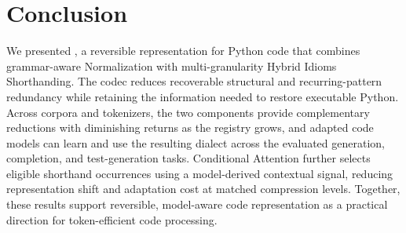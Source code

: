 \section{Conclusion}

We presented \tool, a reversible representation for Python code that combines grammar-aware Normalization with multi-granularity Hybrid Idioms Shorthanding. The codec reduces recoverable structural and recurring-pattern redundancy while retaining the information needed to restore executable Python. Across corpora and tokenizers, the two components provide complementary reductions with diminishing returns as the registry grows, and adapted code models can learn and use the resulting dialect across the evaluated generation, completion, and test-generation tasks. Conditional Attention further selects eligible shorthand occurrences using a model-derived contextual signal, reducing representation shift and adaptation cost at matched compression levels. Together, these results support reversible, model-aware code representation as a practical direction for token-efficient code processing.
